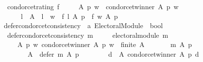 \begin{isabellebody}
\ \ {\isachardoublequoteopen}condorcet{\isacharunderscore}{\kern0pt}rating\ f\ {\isasymequiv}\isanewline
\ \ \ \ {\isasymforall}A\ p\ w\ {\isachardot}{\kern0pt}\ condorcet{\isacharunderscore}{\kern0pt}winner\ A\ p\ w\ {\isasymlongrightarrow}\isanewline
\ \ \ \ \ \ {\isacharparenleft}{\kern0pt}{\isasymforall}l\ {\isasymin}\ A\ {\isachardot}{\kern0pt}\ l\ {\isasymnoteq}\ w\ {\isasymlongrightarrow}\ f\ l\ A\ p\ {\isacharless}{\kern0pt}\ f\ w\ A\ p{\isacharparenright}{\kern0pt}{\isachardoublequoteclose}\isanewline
\isanewline
{}\isamarkupfalse%
\ defer{\isacharunderscore}{\kern0pt}condorcet{\isacharunderscore}{\kern0pt}consistency\ {\isacharcolon}{\kern0pt}{\isacharcolon}{\kern0pt}\ {\isachardoublequoteopen}{\isacharprime}{\kern0pt}a\ Electoral{\isacharunderscore}{\kern0pt}Module\ {\isasymRightarrow}\ bool{\isachardoublequoteclose}\ \isanewline
\ \ {\isachardoublequoteopen}defer{\isacharunderscore}{\kern0pt}condorcet{\isacharunderscore}{\kern0pt}consistency\ m\ {\isasymequiv}\isanewline
\ \ \ \ electoral{\isacharunderscore}{\kern0pt}module\ m\ {\isasymand}\isanewline
\ \ \ \ {\isacharparenleft}{\kern0pt}{\isasymforall}\ A\ p\ w{\isachardot}{\kern0pt}\ condorcet{\isacharunderscore}{\kern0pt}winner\ A\ p\ w\ {\isasymand}\ finite\ A\ {\isasymlongrightarrow}\isanewline
\ \ \ \ \ \ {\isacharparenleft}{\kern0pt}m\ A\ p\ {\isacharequal}{\kern0pt}\isanewline
\ \ \ \ \ \ \ \ {\isacharparenleft}{\kern0pt}{\isacharbraceleft}{\kern0pt}{\isacharbraceright}{\kern0pt}{\isacharcomma}{\kern0pt}\isanewline
\ \ \ \ \ \ \ \ A\ {\isacharminus}{\kern0pt}\ {\isacharparenleft}{\kern0pt}defer\ m\ A\ p{\isacharparenright}{\kern0pt}{\isacharcomma}{\kern0pt}\isanewline
\ \ \ \ \ \ \ \ {\isacharbraceleft}{\kern0pt}d\ {\isasymin}\ A{\isachardot}{\kern0pt}\ condorcet{\isacharunderscore}{\kern0pt}winner\ A\ p\ d{\isacharbraceright}{\kern0pt}{\isacharparenright}{\kern0pt}{\isacharparenright}{\kern0pt}{\isacharparenright}{\kern0pt}{\isachardoublequoteclose}\isanewline
%
\isadelimtheory
\isanewline
%
\endisadelimtheory
%
\isatagtheory
{}\isamarkupfalse%
%
\endisatagtheory
{\isafoldtheory}%
%
\isadelimtheory
%
\endisadelimtheory
%
\end{isabellebody}%
\endinput
